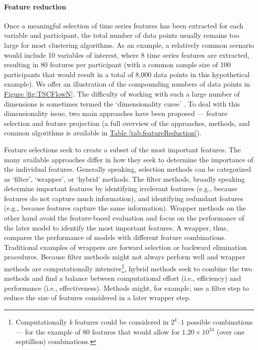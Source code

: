 \documentclass[man, 12pt, a4paper, mask]{apa7}
\theoremstyle{break}
\theoremstyle{plain}
\newcommand{\fgrref}[2][]{\hyperref[#2]{Figure \ref*{#2}#1}}
\newcommand{\tblref}[2][]{\hyperref[#2]{Table \ref*{#2}#1}}
\begin{document}


\paragraph{Feature reduction}
Once a meaningful selection of time series features has been extracted for each variable and participant, the total number of data points usually remains too large for most clustering algorithms. As an example, a relatively common scenario would include 10 variables of interest, where 8 time series features are extracted, resulting in 80 features per participant (with a common sample size of 100 participants that would result in a total of 8,000 data points in this hypothetical example). We offer an illustration of the compounding numbers of data points in \fgrref{fig:TSCFlowN}. The difficulty of working with such a large number of dimensions is sometimes termed the `dimensionality curse' \citep[e.g.,][]{altman2018}. To deal with this dimensionality issue, two main approaches have been proposed --- feature selection and feature projection (a full overview of the approaches, methods, and common algorithms is available in \tblref{tab:featureReduction}). 

Feature selections seek to create a subset of the most important features. The many available approaches differ in how they seek to determine the importance of the individual features. Generally speaking, selection methods can be categorized as `filter', `wrapper', or `hybrid' methods. The filter methods, broadly speaking determine important features by identifying irrelevant features (e.g., because features do not capture much information), and identifying redundant features (e.g., because features capture the same information). Wrapper methods on the other hand avoid the feature-based evaluation and focus on the performance of the later model to identify the most important features. A wrapper, thus, compares the performance of models with different feature combinations. Traditional examples of wrappers are forward selection or backward elimination procedures. Because filter methods might not always perform well and wrapper methods are computationally intensive\footnote{Computationally \textit{k} features could be considered in \(2^k – 1\) possible combinations --- for the example of 80 features that would allow for \(1.20 \times 10^{24}\) (over one septillion) combinations.}, hybrid methods seek to combine the two methods and find a balance between computational effort (i.e., efficiency) and performance (i.e., effectiveness). Methods might, for example, use a filter step to reduce the size of features considered in a later wrapper step.
\end{document}
